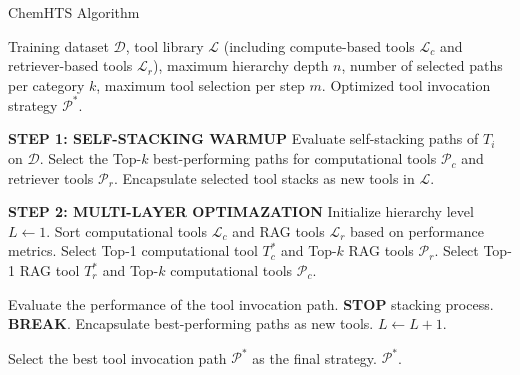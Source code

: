 \begin{algorithm}[H]
\caption{ChemHTS Algorithm}
\small
\label{alg:HTS}
\begin{algorithmic}[1]
\REQUIRE Training dataset $\mathcal{D}$, tool library $\mathcal{L}$ (including compute-based tools $\mathcal{L}_c$ and retriever-based tools $\mathcal{L}_r$), maximum hierarchy depth $n$, number of selected paths per category $k$, maximum tool selection per step $m$.
\ENSURE Optimized tool invocation strategy $\mathcal{P}^*$.

\STATE \textbf{STEP 1: SELF-STACKING WARMUP}
    \STATE Evaluate self-stacking paths of $T_i$ on $\mathcal{D}$.
\ENDFOR
\STATE Select the Top-$k$ best-performing paths for computational tools $\mathcal{P}_c$ and retriever tools $\mathcal{P}_r$.
\STATE Encapsulate selected tool stacks as new tools in $\mathcal{L}$.

\STATE \textbf{STEP 2: MULTI-LAYER OPTIMAZATION}
\STATE Initialize hierarchy level $L \gets 1$.
    \STATE Sort computational tools $\mathcal{L}_c$ and RAG tools $\mathcal{L}_r$ based on performance metrics.
    \STATE Select Top-1 computational tool $T_c^*$ and Top-$k$ RAG tools $\mathcal{P}_r$.
    \STATE Select Top-1 RAG tool $T_r^*$ and Top-$k$ computational tools $\mathcal{P}_c$.
    
        \STATE Evaluate the performance of the tool invocation path.
            \STATE \textbf{STOP} stacking process.
            \STATE \textbf{BREAK}.
        \ENDIF
    \ENDFOR
    \STATE Encapsulate best-performing paths as new tools.
    \STATE $L \gets L + 1$.
\ENDWHILE


\STATE Select the best tool invocation path $\mathcal{P}^*$ as the final strategy.
\RETURN $\mathcal{P}^*$.

\end{algorithmic}
\end{algorithm}
